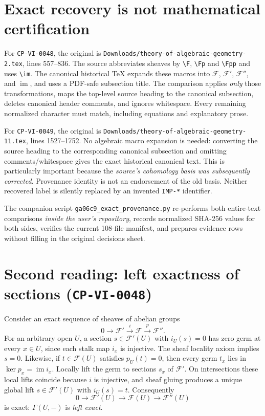 \documentclass[11pt,a4paper]{article}
\newcommand{\cF}{\mathcal F}
\newcommand{\GG}{\Gamma}
\newcommand{\CP}[1]{\texttt{CP-VI-#1}}
\begin{document}
\section{Exact recovery is not mathematical certification}
For \CP{0048}, the original is \texttt{Downloads/theory-of-algebraic-geometry-2.tex}, lines 557--836. The source abbreviates sheaves by \verb|\F|, \verb|\Fp| and \verb|\Fpp| and uses \verb|\im|. The canonical historical TeX expands these macros into \(\mathcal F\), \(\mathcal F'\), \(\mathcal F''\), and \(\operatorname{im}\), and uses a PDF-safe subsection title. The comparison applies \emph{only} those transformations, maps the top-level source heading to the canonical subsection, deletes canonical header comments, and ignores whitespace. Every remaining normalized character must match, including equations and explanatory prose.

For \CP{0049}, the original is \texttt{Downloads/theory-of-algebraic-geometry-11.tex}, lines 1527--1752. No algebraic macro expansion is needed: converting the source heading to the corresponding canonical subsection and omitting comments/whitespace gives the exact historical canonical text. This is particularly important because the \emph{source's cohomology basis was subsequently corrected}. Provenance identity is not an endorsement of the old basis. Neither recovered label is silently replaced by an invented \texttt{IMP-*} identifier.

The companion script \texttt{ga06c9\_exact\_provenance.py} re-performs both entire-text comparisons \emph{inside the user's repository}, records normalized SHA-256 values for both sides, verifies the current 108-file manifest, and prepares evidence rows without filling in the original decisions sheet.

\section{Second reading: left exactness of sections (\CP{0048})}
Consider an exact sequence of sheaves of abelian groups
\[
0\longrightarrow\cF'\xrightarrow{i}\cF\xrightarrow{p}\cF''.
\]
For an arbitrary open \(U\), a section \(s\in\cF'(U)\) with \(i_U(s)=0\) has zero germ at every \(x\in U\), since each stalk map \(i_x\) is injective. The sheaf locality axiom implies \(s=0\). Likewise, if \(t\in\cF(U)\) satisfies \(p_U(t)=0\), then every germ \(t_x\) lies in \(\ker p_x=\operatorname{im}i_x\). Locally lift the germ to sections \(s_x\) of \(\cF'\). On intersections these local lifts coincide because \(i\) is injective, and sheaf gluing produces a unique global lift \(s\in\cF'(U)\) with \(i_U(s)=t\). Consequently
\[
0\longrightarrow\cF'(U)\longrightarrow\cF(U)\longrightarrow\cF''(U)
\]
is exact: \(\GG(U,-)\) is \emph{left exact}.
\end{document}
